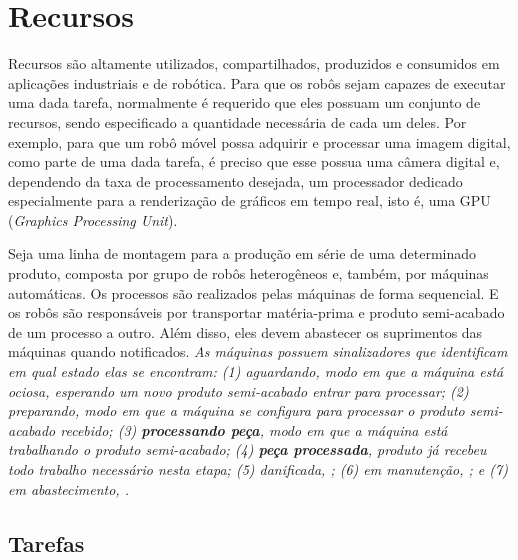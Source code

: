 \chapter[Recursos]{Recursos} \label{cap:recursos}

    Recursos são altamente utilizados, compartilhados, produzidos e consumidos em aplicações industriais e de robótica. Para que os robôs sejam capazes de executar uma dada tarefa, normalmente é requerido que eles possuam um conjunto de recursos, sendo especificado a quantidade necessária de cada um deles. Por exemplo, para que um robô móvel possa adquirir e processar uma imagem digital, como parte de uma dada tarefa, é preciso que esse possua uma câmera digital e, dependendo da taxa de processamento desejada, um processador dedicado especialmente para a renderização de gráficos em tempo real, isto é, uma GPU (\textit{Graphics Processing Unit}).
    
    Seja uma linha de montagem para a produção em série de uma determinado produto, composta por grupo de robôs heterogêneos e, também, por máquinas automáticas. Os processos são realizados pelas máquinas de forma sequencial. E os robôs são responsáveis por transportar matéria-prima e produto semi-acabado de um processo a outro. Além disso, eles devem abastecer os suprimentos das máquinas quando notificados. \emph{\color{red} As máquinas possuem sinalizadores que identificam em qual estado elas se encontram: (1) \textit{aguardando}, modo em que a máquina está ociosa, esperando um novo produto semi-acabado entrar para processar; (2) \textit{preparando}, modo em que a máquina se configura para processar o produto semi-acabado recebido; (3) \textit{\textbf{processando peça}}, modo em que a máquina está trabalhando o produto semi-acabado; (4) \textit{\textbf{peça processada}}, produto já recebeu todo trabalho necessário nesta etapa; (5) \textit{danificada}, ; (6) \textit{em manutenção}, ; e (7) \textit{em abastecimento}, .}
    
    \section{Tarefas} \label{sec:tarefa}
        
